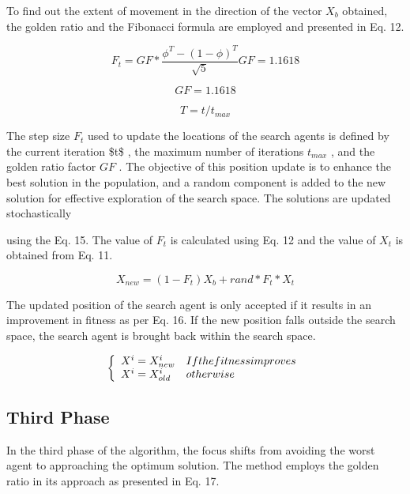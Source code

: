 To find out the extent of movement in the direction of the vector $X_{b}$ obtained, the golden ratio and the Fibonacci formula are employed and presented in Eq. 12.

\begin{equation}
F_{t}=G F*\frac{\phi^{T}-(1-\phi)^{T}}{\sqrt{5}}G F=1.1618
\end{equation}

\begin{equation}
G F=1.1618
\end{equation}

\begin{equation}
T=t/t_{m a x}
\end{equation}

The step size $F_{t}$ used to update the locations of the search agents is defined by the current iteration \$t\$ , the maximum number of iterations $t_{m a x}$ , and the golden ratio factor $G F$ . The objective of this position update is to enhance the best solution in the population, and a random component is added to the new solution for effective exploration of the search space. The solutions are updated stochastically

using the Eq. 15. The value of $F_{t}$ is calculated using Eq.
12 and the value of $X_{t}$ is obtained from Eq. 11.

\begin{equation}
X_{n e w}=(1-F_{t})X_{b}+r a n d*F_{t}*X_{t}
\end{equation}

The updated position of the search agent is only accepted if it results in an improvement in fitness as per Eq. 16. If the new position falls outside the search space, the search agent is brought back within the search space.

\begin{equation}
\left\{\begin{array}{l l}{X^{i}=X_{n e w}^{i}}&{I f t h e f i t n e s s i m p r o v e s}\\ {X^{i}=X_{o l d}^{i}}&{o t h e r w i s e}\end{array}\right.
\end{equation}

\subsection{Third Phase}

In the third phase of the algorithm, the focus shifts from avoiding the worst agent to approaching the optimum solution. The method employs the golden ratio in its approach as presented in Eq. 17.

